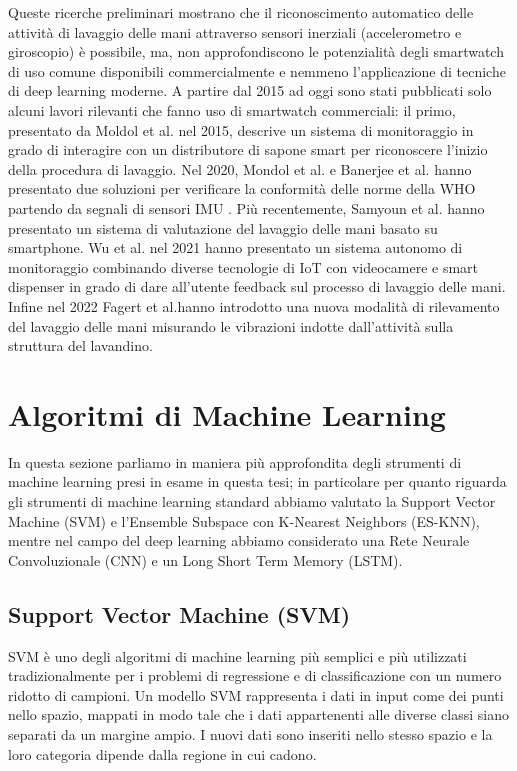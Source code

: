 Queste ricerche preliminari mostrano che il riconoscimento automatico delle attività di lavaggio delle mani attraverso sensori inerziali (accelerometro e giroscopio) è possibile, ma, non approfondiscono le potenzialità degli smartwatch di uso comune disponibili commercialmente e nemmeno l'applicazione di tecniche di deep learning moderne.
A partire dal 2015 ad oggi sono stati pubblicati solo alcuni lavori rilevanti che fanno uso di smartwatch commerciali: il primo, presentato da Moldol et al. nel 2015, descrive un sistema di monitoraggio in grado di interagire con un distributore di sapone smart per riconoscere l'inizio della procedura di lavaggio\cite{mondol2015harmony}. Nel 2020, Mondol et al. e Banerjee et al. hanno presentato due soluzioni per verificare la conformità delle norme della WHO partendo da segnali di sensori IMU \cite{mondol2020hawad}\cite{banerjee2020hand}. Più recentemente, Samyoun et al. hanno presentato un sistema di valutazione del lavaggio delle mani basato su smartphone\cite{samyoun2021iwash}. Wu et al. nel 2021 hanno presentato un sistema autonomo di monitoraggio combinando diverse tecnologie di IoT con videocamere e smart dispenser in grado di dare all'utente feedback sul processo di lavaggio delle mani. Infine nel 2022 Fagert et al.hanno introdotto una nuova modalità di rilevamento del lavaggio delle mani misurando le vibrazioni indotte dall'attività sulla struttura del lavandino\cite{fagert2022clean}.

\section{Algoritmi di Machine Learning}
\label{sec:ml-algorithms}

In questa sezione parliamo in maniera più approfondita degli strumenti di machine learning presi in esame in questa tesi; in particolare per quanto riguarda gli strumenti di machine learning standard abbiamo valutato la Support Vector Machine (SVM) e l'Ensemble Subspace con K-Nearest Neighbors (ES-KNN), mentre nel campo del deep learning abbiamo considerato una Rete Neurale Convoluzionale (CNN) e un Long Short Term Memory (LSTM).

\subsection{Support Vector Machine (SVM)}
\label{ssec:svm}

SVM è uno degli algoritmi di machine learning più semplici e più utilizzati tradizionalmente per i problemi di regressione e di classificazione con un numero ridotto di campioni.
Un modello SVM rappresenta i dati in input come dei punti nello spazio, mappati in modo tale che i dati appartenenti alle diverse classi siano separati da un margine ampio. I nuovi dati sono inseriti nello stesso spazio e la loro categoria dipende dalla regione in cui cadono.

